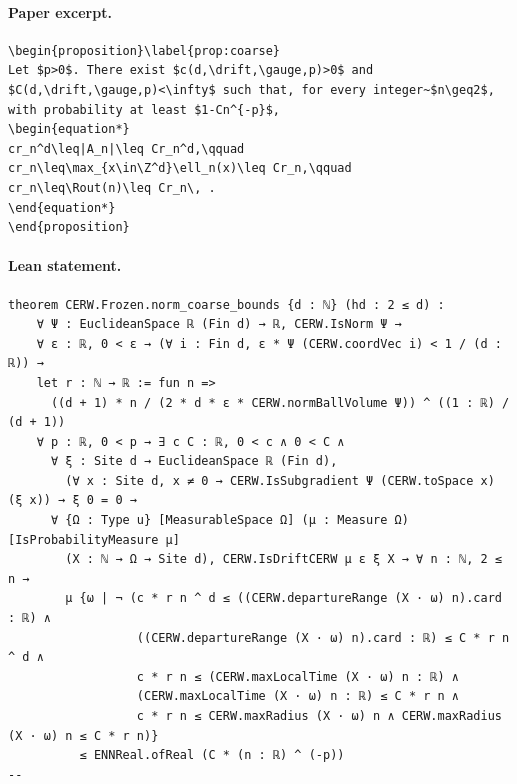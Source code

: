 \paragraph{Paper excerpt.}
\begin{verbatim}
\begin{proposition}\label{prop:coarse}
Let $p>0$. There exist $c(d,\drift,\gauge,p)>0$ and $C(d,\drift,\gauge,p)<\infty$ such that, for every integer~$n\geq2$, with probability at least $1-Cn^{-p}$,
\begin{equation*}
cr_n^d\leq|A_n|\leq Cr_n^d,\qquad
cr_n\leq\max_{x\in\Z^d}\ell_n(x)\leq Cr_n,\qquad
cr_n\leq\Rout(n)\leq Cr_n\, .
\end{equation*}
\end{proposition}
\end{verbatim}
\paragraph{Lean statement.}
\begin{verbatim}
theorem CERW.Frozen.norm_coarse_bounds {d : ℕ} (hd : 2 ≤ d) :
    ∀ Ψ : EuclideanSpace ℝ (Fin d) → ℝ, CERW.IsNorm Ψ →
    ∀ ε : ℝ, 0 < ε → (∀ i : Fin d, ε * Ψ (CERW.coordVec i) < 1 / (d : ℝ)) →
    let r : ℕ → ℝ := fun n =>
      ((d + 1) * n / (2 * d * ε * CERW.normBallVolume Ψ)) ^ ((1 : ℝ) / (d + 1))
    ∀ p : ℝ, 0 < p → ∃ c C : ℝ, 0 < c ∧ 0 < C ∧
      ∀ ξ : Site d → EuclideanSpace ℝ (Fin d),
        (∀ x : Site d, x ≠ 0 → CERW.IsSubgradient Ψ (CERW.toSpace x) (ξ x)) → ξ 0 = 0 →
      ∀ {Ω : Type u} [MeasurableSpace Ω] (μ : Measure Ω) [IsProbabilityMeasure μ]
        (X : ℕ → Ω → Site d), CERW.IsDriftCERW μ ε ξ X → ∀ n : ℕ, 2 ≤ n →
        μ {ω | ¬ (c * r n ^ d ≤ ((CERW.departureRange (X · ω) n).card : ℝ) ∧
                  ((CERW.departureRange (X · ω) n).card : ℝ) ≤ C * r n ^ d ∧
                  c * r n ≤ (CERW.maxLocalTime (X · ω) n : ℝ) ∧
                  (CERW.maxLocalTime (X · ω) n : ℝ) ≤ C * r n ∧
                  c * r n ≤ CERW.maxRadius (X · ω) n ∧ CERW.maxRadius (X · ω) n ≤ C * r n)}
          ≤ ENNReal.ofReal (C * (n : ℝ) ^ (-p))
--
\end{verbatim}
